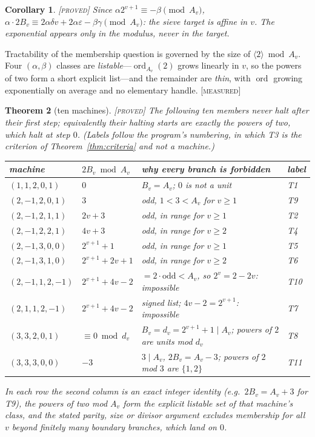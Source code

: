 \documentclass[11pt]{article}
\newtheorem{theorem}{Theorem}[section]
\newtheorem{corollary}[theorem]{Corollary}
\theoremstyle{definition}
\theoremstyle{remark}
\newcommand{\ord}{\operatorname{ord}}
\newcommand{\Proved}{\textsc{[proved]}}
\newcommand{\Meas}{\textsc{[measured]}}
\begin{document}
\begin{corollary}\label{cor:linear}
\Proved{}\; Since $\alpha2^{v+1}\equiv-\beta\pmod{A_v}$,
$\alpha\cdot 2B_v\equiv 2\alpha\delta v+2\alpha\varepsilon-\beta\gamma
\pmod{A_v}$: the sieve target is affine in $v$.  The exponential appears only
in the modulus, never in the target.
\end{corollary}

Tractability of the membership question is governed by the size of
$\langle2\rangle \bmod A_v$.  Four $(\alpha,\beta)$ classes are
\emph{listable}---$\ord_{A_v}(2)$ grows linearly in $v$, so the powers of two
form a short explicit list---and the remainder are \emph{thin}, with $\ord$
growing exponentially on average and no elementary handle. \Meas{}

\begin{theorem}[ten machines]\label{thm:ten}
\Proved{}\; The following ten members never halt after their first step;
equivalently their halting starts are exactly the powers of two, which halt at
step $0$.  (Labels follow the program's numbering, in which T3 is the criterion
of Theorem~\ref{thm:criteria} and not a machine.)
\begin{center}
\small
\begin{tabular}{@{}llll@{}}
\toprule
machine & $2B_v \bmod A_v$ & why every branch is forbidden & label\\
\midrule
$(1,1,2,0,1)$ & $0$ & $B_v=A_v$; $0$ is not a unit & T1\\
$(2,-1,2,0,1)$ & $3$ & odd, $1<3<A_v$ for $v\ge1$ & T9\\
$(2,-1,2,1,1)$ & $2v+3$ & odd, in range for $v\ge1$ & T2\\
$(2,-1,2,2,1)$ & $4v+3$ & odd, in range for $v\ge2$ & T4\\
$(2,-1,3,0,0)$ & $2^{v+1}+1$ & odd, in range for $v\ge1$ & T5\\
$(2,-1,3,1,0)$ & $2^{v+1}+2v+1$ & odd, in range for $v\ge2$ & T6\\
$(2,-1,1,2,-1)$ & $2^{v+1}+4v-2$ & $=2\cdot\text{odd}<A_v$, so
  $2^{v}=2-2v$: impossible & T10\\
$(2,1,1,2,-1)$ & $2^{v+1}+4v-2$ & signed list; $4v-2=2^{v+1}$: impossible
  & T7\\
$(3,3,2,0,1)$ & $\equiv0 \bmod d_v$ & $B_v=d_v=2^{v+1}+1\mid A_v$; powers of
  $2$ are units mod $d_v$ & T8\\
$(3,3,3,0,0)$ & $-3$ & $3\mid A_v$, $2B_v=A_v-3$; powers of $2$ mod $3$ are
  $\{1,2\}$ & T11\\
\bottomrule
\end{tabular}
\end{center}
In each row the second column is an exact integer identity (e.g.\
$2B_v=A_v+3$ for T9), the powers of two mod $A_v$ form the explicit listable
set of that machine's class, and the stated parity, size or divisor argument
excludes membership for all $v$ beyond finitely many boundary branches, which
land on $0$.
\end{theorem}
\end{document}
